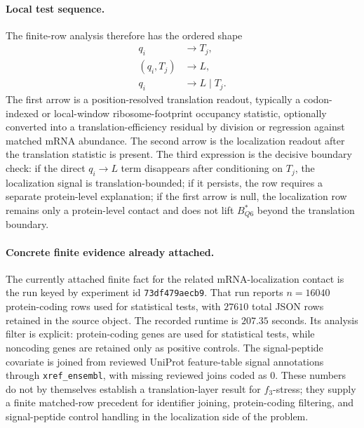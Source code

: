 \paragraph{Local test sequence.}
The finite-row analysis therefore has the ordered shape
$$
\begin{aligned}
 q_i &\longrightarrow T_j,\\
 (q_i,T_j) &\longrightarrow L,\\
 q_i &\longrightarrow L \mid T_j.
\end{aligned}
$$
The first arrow is a position-resolved translation readout, typically a codon-indexed or local-window ribosome-footprint occupancy statistic, optionally converted into a translation-efficiency residual by division or regression against matched mRNA abundance.  The second arrow is the localization readout after the translation statistic is present.  The third expression is the decisive boundary check: if the direct $q_i \to L$ term disappears after conditioning on $T_j$, the localization signal is translation-bounded; if it persists, the row requires a separate protein-level explanation; if the first arrow is null, the localization row remains only a protein-level contact and does not lift $B^*_{Q6}$ beyond the translation boundary.

\paragraph{Concrete finite evidence already attached.}
The currently attached finite fact for the related mRNA-localization contact is the run keyed by experiment id \texttt{73df479aecb9}.  That run reports $n=16040$ protein-coding rows used for statistical tests, with $27610$ total JSON rows retained in the source object.  The recorded runtime is $207.35$ seconds.  Its analysis filter is explicit: protein-coding genes are used for statistical tests, while noncoding genes are retained only as positive controls.  The signal-peptide covariate is joined from reviewed UniProt feature-table signal annotations through \texttt{xref\_ensembl}, with missing reviewed joins coded as $0$.  These numbers do not by themselves establish a translation-layer result for $f_3$-stress; they supply a finite matched-row precedent for identifier joining, protein-coding filtering, and signal-peptide control handling in the localization side of the problem.

